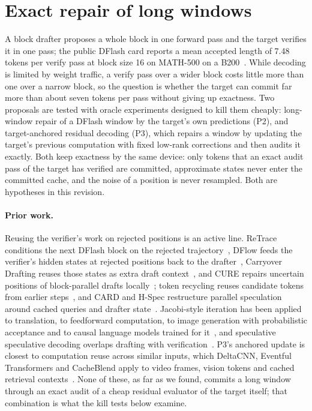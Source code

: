\section{Exact repair of long windows}\label{sec:repair}
A block drafter proposes a whole block in one forward pass and the target verifies it in one pass; the public DFlash card reports a mean accepted length of 7.48 tokens per verify pass at block size 16 on MATH-500 on a B200~\cite{dflash4bcard}. While decoding is limited by weight traffic, a verify pass over a wider block costs little more than one over a narrow block, so the question is whether the target can commit far more than about seven tokens per pass without giving up exactness. Two proposals are tested with oracle experiments designed to kill them cheaply: long-window repair of a DFlash window by the target's own predictions (P2), and target-anchored residual decoding (P3), which repairs a window by updating the target's previous computation with fixed low-rank corrections and then audits it exactly. Both keep exactness by the same device: only tokens that an exact audit pass of the target has verified are committed, approximate states never enter the committed cache, and the noise of a position is never resampled. Both are hypotheses in this revision.

\paragraph{Prior work.} Reusing the verifier's work on rejected positions is an active line. ReTrace conditions the next DFlash block on the rejected trajectory~\cite{retrace2026}, DFlow feeds the verifier's hidden states at rejected positions back to the drafter~\cite{dflow}, Carryover Drafting reuses those states as extra draft context~\cite{carryover2026}, and CURE repairs uncertain positions of block-parallel drafts locally~\cite{cure2026}; token recycling reuses candidate tokens from earlier steps~\cite{tokenrecycling2024}, and CARD and H-Spec restructure parallel speculation around cached queries and drafter state~\cite{card2025,hspec2026}. Jacobi-style iteration has been applied to translation, to feedforward computation, to image generation with probabilistic acceptance and to causal language models trained for it~\cite{santilli2023jacobi,song2021parallel,sjd2025,so2026scd,hu2026jacobiforcing}, and speculative speculative decoding overlaps drafting with verification~\cite{specspec}. P3's anchored update is closest to computation reuse across similar inputs, which DeltaCNN, Eventful Transformers and CacheBlend apply to video frames, vision tokens and cached retrieval contexts~\cite{deltacnn2022,eventful2023,cacheblend2025}. None of these, as far as we found, commits a long window through an exact audit of a cheap residual evaluator of the target itself; that combination is what the kill tests below examine.

